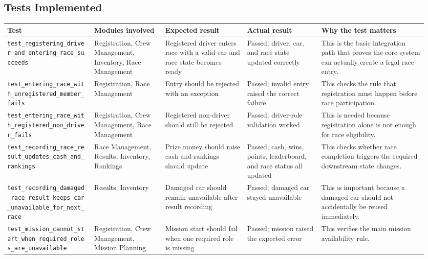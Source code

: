 \documentclass[12pt]{article}
\begin{document}
\subsection{Tests Implemented}
\begin{longtable}{p{}p{}p{}p{}p{}}
\toprule
\textbf{Test} & \textbf{Modules involved} & \textbf{Expected result} & \textbf{Actual result} & \textbf{Why the test matters} \\
\midrule
\endhead
\texttt{test\_registering\_driver\_and\_entering\_race\_succeeds} & Registration, Crew Management, Inventory, Race Management & Registered driver enters race with a valid car and race state becomes ready & Passed; driver, car, and race state updated correctly & This is the basic integration path that proves the core system can actually create a legal race entry. \\
\texttt{test\_entering\_race\_with\_unregistered\_member\_fails} & Registration, Race Management & Entry should be rejected with an exception & Passed; invalid entry raised the correct failure & This checks the rule that registration must happen before race participation. \\
\texttt{test\_entering\_race\_with\_registered\_non\_driver\_fails} & Registration, Crew Management, Race Management & Registered non-driver should still be rejected & Passed; driver-role validation worked & This is needed because registration alone is not enough for race eligibility. \\
\texttt{test\_recording\_race\_result\_updates\_cash\_and\_rankings} & Race Management, Results, Inventory, Rankings & Prize money should raise cash and rankings should update & Passed; cash, wins, points, leaderboard, and race status all updated & This checks whether race completion triggers the required downstream state changes. \\
\texttt{test\_recording\_damaged\_race\_result\_keeps\_car\_unavailable\_for\_next\_race} & Results, Inventory & Damaged car should remain unavailable after result recording & Passed; damaged car stayed unavailable & This is important because a damaged car should not accidentally be reused immediately. \\
\texttt{test\_mission\_cannot\_start\_when\_required\_roles\_are\_unavailable} & Registration, Crew Management, Mission Planning & Mission start should fail when one required role is missing & Passed; mission raised the expected error & This verifies the main mission availability rule. \\

\end{longtable}
\end{document}

